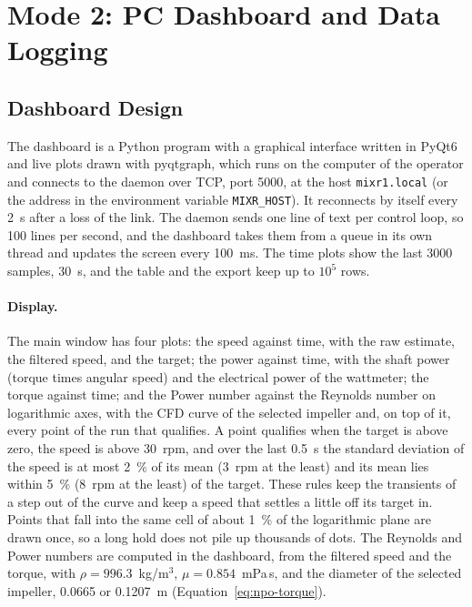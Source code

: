 \section{Mode 2: PC Dashboard and Data Logging}
\label{sec:agit-mode2}

\subsection{Dashboard Design}
\label{subsec:agit-dashboard}

The dashboard is a Python program with a graphical interface written in PyQt6 and live plots drawn with pyqtgraph, which runs on the computer of the operator and connects to the daemon over TCP, port 5000, at the host \texttt{mixr1.local} (or the address in the environment variable \texttt{MIXR\_HOST}). It reconnects by itself every 2~s after a loss of the link. The daemon sends one line of text per control loop, so 100 lines per second, and the dashboard takes them from a queue in its own thread and updates the screen every 100~ms. The time plots show the last 3000 samples, 30~s, and the table and the export keep up to $10^{5}$ rows.

\paragraph{Display.}
The main window has four plots: the speed against time, with the raw estimate, the filtered speed, and the target; the power against time, with the shaft power (torque times angular speed) and the electrical power of the wattmeter; the torque against time; and the Power number against the Reynolds number on logarithmic axes, with the CFD curve of the selected impeller and, on top of it, every point of the run that qualifies. A point qualifies when the target is above zero, the speed is above 30~rpm, and over the last 0.5~s the standard deviation of the speed is at most 2~\% of its mean (3~rpm at the least) and its mean lies within 5~\% (8~rpm at the least) of the target. These rules keep the transients of a step out of the curve and keep a speed that settles a little off its target in. Points that fall into the same cell of about 1~\% of the logarithmic plane are drawn once, so a long hold does not pile up thousands of dots. The Reynolds and Power numbers are computed in the dashboard, from the filtered speed and the torque, with $\rho = 996.3$~kg/m$^3$, $\mu = 0.854$~mPa\,s, and the diameter of the selected impeller, 0.0665 or 0.1207~m (Equation~\ref{eq:npo-torque}).

